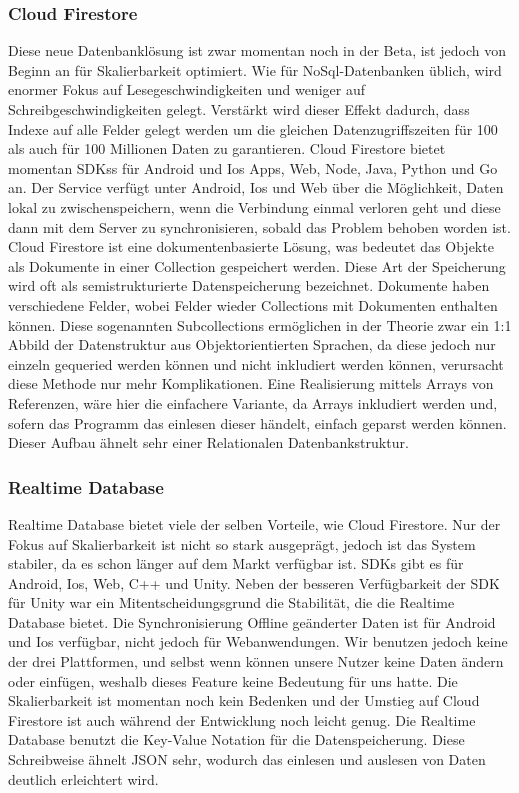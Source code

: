 \subsubsection{Cloud Firestore}
Diese neue Datenbanklösung ist zwar momentan noch in der Beta, ist jedoch von Beginn an für Skalierbarkeit optimiert. Wie für NoSql-Datenbanken üblich, wird enormer Fokus auf Lesegeschwindigkeiten und weniger auf Schreibgeschwindigkeiten gelegt. Verstärkt wird dieser Effekt dadurch, dass Indexe auf alle Felder gelegt werden um die gleichen Datenzugriffszeiten für 100 als auch für 100 Millionen Daten zu garantieren. Cloud Firestore bietet momentan SDKss für Android und Ios Apps, Web, Node, Java, Python und Go an. Der Service verfügt unter Android, Ios und Web über die Möglichkeit, Daten lokal zu zwischenspeichern, wenn die Verbindung einmal verloren geht und diese dann mit dem Server zu synchronisieren, sobald das Problem behoben worden ist. Cloud Firestore ist eine dokumentenbasierte Lösung, was bedeutet das Objekte als Dokumente in einer Collection gespeichert werden. Diese Art der Speicherung wird oft als semistrukturierte Datenspeicherung bezeichnet. Dokumente haben verschiedene Felder, wobei Felder wieder Collections mit Dokumenten enthalten können. Diese sogenannten Subcollections ermöglichen in der Theorie zwar ein 1:1 Abbild der Datenstruktur aus Objektorientierten Sprachen, da diese jedoch nur einzeln gequeried werden können und nicht inkludiert werden können, verursacht diese Methode nur mehr Komplikationen. Eine Realisierung mittels Arrays von Referenzen, wäre hier die einfachere Variante, da Arrays inkludiert werden und, sofern das Programm das einlesen dieser händelt, einfach geparst werden können. Dieser Aufbau ähnelt sehr einer Relationalen Datenbankstruktur.
\subsubsection{Realtime Database}
Realtime Database bietet viele der selben Vorteile, wie Cloud Firestore. Nur der Fokus auf Skalierbarkeit ist nicht so stark ausgeprägt, jedoch ist das System stabiler, da es schon länger auf dem Markt verfügbar ist. SDKs gibt es für Android, Ios, Web, C++ und Unity. Neben der besseren Verfügbarkeit der SDK für Unity war ein Mitentscheidungsgrund die Stabilität, die die Realtime Database bietet. Die Synchronisierung Offline geänderter Daten ist für Android und Ios verfügbar, nicht jedoch für Webanwendungen. Wir benutzen jedoch keine der drei Plattformen, und selbst wenn können unsere Nutzer keine Daten ändern oder einfügen, weshalb dieses Feature keine Bedeutung für uns hatte. Die Skalierbarkeit ist momentan noch kein Bedenken und der Umstieg auf Cloud Firestore ist auch während der Entwicklung noch leicht genug. Die Realtime Database benutzt die Key-Value Notation für die Datenspeicherung. Diese Schreibweise ähnelt JSON sehr, wodurch das einlesen und auslesen von Daten deutlich erleichtert wird.

